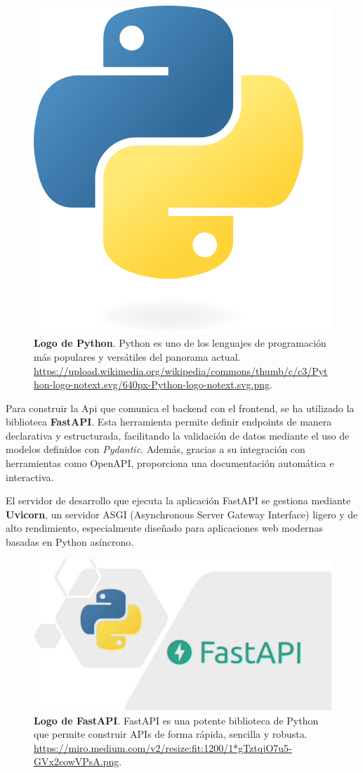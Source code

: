 \begin{figure}[H]
	\centering
	\includegraphics[width=0.5\linewidth]{imagenes/pythonLogo.png}
	\caption[\textbf{Logo de Python}.]{\textbf{Logo de Python}. Python es uno de los lenguajes de programación más populares y versátiles del panorama actual. \href{https://upload.wikimedia.org/wikipedia/commons/thumb/c/c3/Python-logo-notext.svg/640px-Python-logo-notext.svg.png}{https://upload.wikimedia.org/wikipedia/commons/thumb/c/c3/Python-logo-notext.svg/640px-Python-logo-notext.svg.png}.}
	\label{fig:python-logo}
\end{figure}

Para construir la Api que comunica el backend con el frontend, se ha utilizado la biblioteca \textbf{FastAPI}. Esta herramienta permite definir endpoints de manera declarativa y estructurada, facilitando la validación de datos mediante el uso de modelos definidos con \textit{Pydantic}. Además, gracias a su integración con herramientas como OpenAPI, proporciona una documentación automática e interactiva.

El servidor de desarrollo que ejecuta la aplicación FastAPI se gestiona mediante \textbf{Uvicorn}, un servidor ASGI (Asynchronous Server Gateway Interface) ligero y de alto rendimiento, especialmente diseñado para aplicaciones web modernas basadas en Python asíncrono. \cite{lubanovic2023fastapi}  \cite{lathkar2023getting}

\begin{figure}[H]
	\centering
	\includegraphics[width=1\linewidth]{imagenes/fastapiLogo.png}
	\caption[\textbf{Logo de FastAPI}.]{\textbf{Logo de FastAPI}. FastAPI es una potente biblioteca de Python que permite construir APIs de forma rápida, sencilla y robusta. \href{https://miro.medium.com/v2/resize:fit:1200/1*gTztqjO7u5-GVx2cowVPsA.png}{https://miro.medium.com/v2/resize:fit:1200/1*gTztqjO7u5-GVx2cowVPsA.png}.}
	\label{fig:fastapi-logo}
\end{figure}


